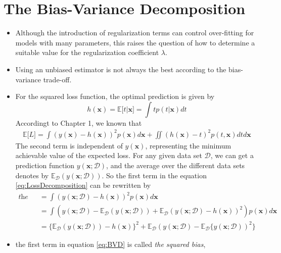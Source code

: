 \documentclass[12pt, a4paper]{article}
\newcommand{\E}{\mathbb{E}}
\begin{document}
    \section{The Bias-Variance Decomposition}
    \begin{itemize}
        \item Although the introduction of regularization terms can control over-fitting for models 
        with many parameters, this raises the question of how to determine a suitable value for the 
        regularization coefficient $\lambda$.
        \item Using an unbiased estimator is not always the best according to the bias-variance 
        trade-off.
        \item For the squared loss function, the optimal prediction is given by 
        \begin{equation*}
            h(\bm{x})=\E\lbrack t|\bm{x}\rbrack=\int tp(t|\bm{x})dt
        \end{equation*}
        Accordingt to Chapter 1, we known that
        \begin{eqnarray}
            \label{eq:LossDecomposition}
            \E\lbrack L\rbrack=\int(y(\bm{x})-h(\bm{x}))^2p(\bm{x})d\bm{x}+\iint(h(\bm{x})-t)^2p(t,\bm{x})
            dtd\bm{x}
        \end{eqnarray}
        The second term is independent of $y(\bm{x})$, representing the minimum achievable value of the 
        expected loss. For any given data set $\mathcal{D}$, we can get a prediction function 
        $y(\bm{x};\mathcal{D})$, and the average over the different data sets denotes by 
        $\E_{\mathcal{D}}(y(\bm{x};\mathcal{D}))$. So the first term in the equation 
        \ref{eq:LossDecomposition} can be rewritten by
        \begin{align}
            \label{eq:BVD}
            \textit{the first term}&=\int(y(\bm{x};\mathcal{D})-h(\bm{x}))^2
            p(\bm{x})d\bm{x}\nonumber\\
            &=\int(y(\bm{x};\mathcal{D})-\E_{\mathcal{D}}(y(\bm{x};\mathcal{D}))+
            \E_{\mathcal{D}}(y(\bm{x};\mathcal{D})-h(\bm{x}))^2)p(\bm{x})d\bm{x}\nonumber\\
            &=\{\E_{\mathcal{D}}(y(\bm{x};\mathcal{D}))-h(\bm{x})\}^2+\E_{\mathcal{D}}
            (y(\bm{x};\mathcal{D})-\E_{\mathcal{D}}\{y(\bm{x};\mathcal{D}))^2\}
        \end{align}
        \item the first term in equation \ref{eq:BVD} is called 
        \textit{the squared bias}, 

\end{itemize}
\end{document}

